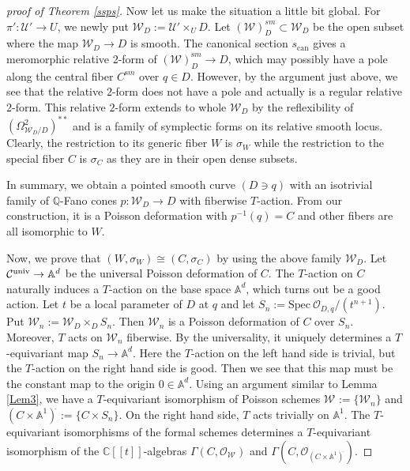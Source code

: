 \documentclass[12pt,a4paper]{amsart}
\theoremstyle{remark}
\theoremstyle{definition}
\def\C{\mathbb{C}}
\def\Q{\mathbb{Q}}
\begin{document}
\begin{proof}[proof of Theorem \ref{ssps}]
Now let us make the situation a little bit global. 
For $\pi': \mathcal{U}' \to U$, 
we newly put $\mathcal{W}_D := \mathcal{U}' \times_{U} D$. Let $(\mathcal{W})^{sm}_D \subset \mathcal{W}_D$ 
be the open subset where the map $\mathcal{W}_D \to D$ 
is smooth. 
The canonical section $s_{\mathrm{can}}$ gives a meromorphic relative 2-form of $(\mathcal{W})^{\mathrm  sm}_D \to D$, 
which may possibly have a pole along the central fiber 
$C^{\mathrm sm}$ over $q \in D$. However, by the argument just above, we see that the relative $2$-form does not have a pole and actually is a regular relative 2-form.    
This relative $2$-form extends to whole $\mathcal{W}_D$ 
by the reflexibility of 
$(\Omega^2_{\mathcal{W}_D/D})^{**}$ 
and is a family of symplectic forms on its 
relative smooth locus. Clearly, the restriction to 
its generic fiber $W$ is $\sigma_W$ while the restriction 
to the special fiber $C$ is $\sigma_C$ as they are 
in their open dense subsets. 

In summary, 
we obtain a pointed smooth curve $(D\ni q)$ 
with an isotrivial family of $\Q$-Fano cones  $p\colon \mathcal{W}_D\to D$ with fiberwise $T$-action. 
From our construction, 
it is a Poisson deformation with $p^{-1}(q)=C$ 
and other fibers are all isomorphic to $W$. 

Now, we prove that 
$(W, \sigma_W) \cong (C, \sigma_C)$ by using the above family $\mathcal{W}_D$. 
Let $\mathcal{C}^{\rm univ} \to \mathbb{A}^d$ be the universal Poisson deformation of $C$. The $T$-action on $C$ naturally induces a $T$-action on 
the base space $\mathbb{A}^d$, which turns out be a good action. 
Let $t$ be a local parameter of $D$ at $q$ and let $S_n := \mathrm{Spec}\: \mathcal{O}_{D,q}/(t^{n+1})$. 
Put $\mathcal{W}_n := \mathcal{W}_D \times_D S_n$. Then $\mathcal{W}_n$ is a Poisson deformation of $C$ over $S_n$. Moreover, $T$ acts on $\mathcal{W}_n$ fiberwise. 
By the universality, it uniquely determines a $T$-equivariant map $S_n \to \mathbb{A}^d$. Here the $T$-action on the left hand side is trivial, but the $T$-action on the right hand side is good. Then we see that this map must be the constant map to the origin $0 \in\mathbb{A}^d$.
Using an argument similar to Lemma \ref{Lem3}, we have a 
$T$-equivariant isomorphism of Poisson schemes ${\mathcal W}^{\hat{}} := \{\mathcal{W}_n\}$ 
and $(C \times \mathbb{A}^1)^{\hat{}} := \{C \times S_n\}$. 
On the right hand side, $T$ acts trivially on 
$\mathbb{A}^1$.  
The $T$-equivariant isomorphisms of the formal schemes determines a $T$-equivariant isomorphism of the $\C[[t]]$-algebras 
$\Gamma (C, \mathcal{O}_{{\mathcal W}^{\hat{}}})$
and $\Gamma (C, \mathcal{O}_{(C \times \mathbb{A}^1)^{\hat{}}})$. 


\end{proof}
\end{document}
